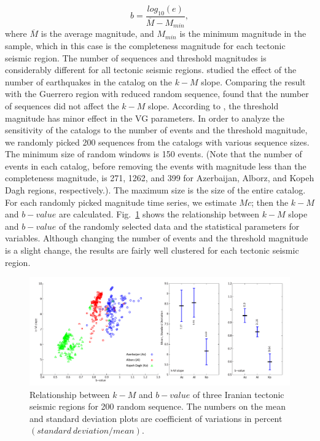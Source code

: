 \begin{equation}
b = \frac{log_{10}(e) }{\overline{M} - M_{min}},
\end{equation}
 \noindent
where $\overline{M}$ is the average magnitude, and  $M_ {min}$ is the minimum magnitude in the sample, which in this case is the completeness magnitude for each tectonic seismic region. The number of sequences and threshold magnitudes is considerably different for all tectonic seismic regions.  \citet{Telesca2013}  studied the effect of the number of earthquakes in the catalog on the  $k-M$  slope. Comparing the result with the Guerrero region with reduced random sequence,  \citet{Telesca2013}  found that the number of sequences did not affect the  $k-M$  slope.  According to  \citet{Telesca2012}, the threshold magnitude has minor effect in the VG parameters. In order to analyze the sensitivity of the catalogs to the number of events and the threshold magnitude, we randomly picked 200 sequences from the catalogs with various sequence sizes. The minimum size of random windows is 150 events. (Note that the number of events in each catalog, before removing the events with magnitude less than the completeness magnitude, is 271, 1262, and 399 for Azerbaijan, Alborz, and Kopeh Dagh regions, respectively.). The maximum size is the size of the entire catalog. For each randomly picked magnitude time series,  we estimate $Mc$; then the $k-M$  and $b-value$ are calculated. Fig.~\ref{fig:random} shows the relationship between  $k-M$  slope and  $b-value$  of the randomly selected data and the statistical parameters for variables. Although changing the number of events and the threshold magnitude is a slight change, the results are fairly well clustered for each tectonic seismic region. 
   
 \begin{figure} [ht]
\centering
\includegraphics[scale=0.5]{figures/pdf/Figure07.pdf} 
\caption{ Relationship between $k-M$ and $b-value$ of three Iranian tectonic seismic regions for 200 random sequence. The numbers on the mean and standard deviation plots are coefficient of variations in percent$(standard \ deviation / mean)$.}
\label{fig:random}
\end{figure}

